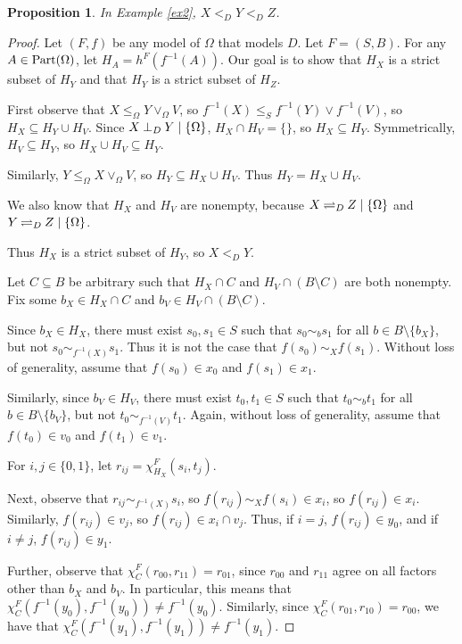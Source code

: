 \documentclass[authordate,onecolumn]{miri-tech-article}
\newtheorem{proposition}{Proposition}
\begin{document}
\begin{proposition}\label{exth2}
In Example \ref{ex2}, $X<_D Y<_D Z$.
\end{proposition}
\begin{proof}
Let $(F,f)$ be any model of $\Omega$ that models $D$. Let $F=(S,B)$. For any $A\in\parts[\Omega]$, let $H_A=h^F(f^{-1}(A))$. Our goal is to show that $H_X$ is a strict subset of $H_Y$ and that $H_Y$ is a strict subset of $H_Z$.

First observe that $X\leq_\Omega Y\vee_\Omega V$, so $f^{-1}(X)\leq_S f^{-1}(Y)\vee f^{-1}(V)$, so $H_X\subseteq H_Y\cup H_V$. Since $\cod{X}{Y}{\{\Omega\}}$, $H_X\cap H_V=\{\}$, so $H_X\subseteq H_Y$. Symmetrically, $H_V\subseteq H_Y$, so $H_X\cup H_V\subseteq H_Y$.

Similarly, $Y\leq_\Omega X\vee_\Omega V$, so $H_Y\subseteq H_X\cup H_V$. Thus $H_Y=H_X\cup H_V$.

We also know that $H_X$ and $H_V$ are nonempty, because $\ncod{X}{Z}{\{\Omega\}}$ and $\ncod{Y}{Z}{\{\Omega\}}$.

Thus $H_X$ is a strict subset of $H_Y$, so $X<_D Y$.

Let $C\subseteq B$ be arbitrary such that $H_X\cap C$ and $H_V\cap (B\setminus C)$ are both nonempty. Fix some $b_X\in H_X\cap C$ and $b_V\in H_V\cap (B\setminus C)$.

Since $b_X\in H_X$, there must exist $s_0,s_1\in S$ such that $s_0\sim_b s_1$ for all $b\in B\setminus\{b_X\}$, but not $s_0\sim_{f^{-1}(X)} s_1$. Thus it is not the case that $f(s_0)\sim_X f(s_1)$. Without loss of generality, assume that $f(s_0)\in x_0$ and $f(s_1)\in x_1$.

Similarly, since $b_V\in H_V$, there must exist $t_0,t_1\in S$ such that $t_0\sim_b t_1$ for all $b\in B\setminus\{b_V\}$, but not $t_0\sim_{f^{-1}(V)} t_1$. Again, without loss of generality, assume that $f(t_0)\in v_0$ and $f(t_1)\in v_1$. 

For $i,j\in \{0,1\}$, let $r_{ij}=\chi^F_{H_X}(s_i,t_j)$.

Next, observe that $r_{ij}\sim_{f^{-1}(X)} s_i$, so  $f(r_{ij})\sim_X f(s_i)\in x_i$, so $f(r_{ij})\in x_i$. Similarly, $f(r_{ij})\in v_j$, so $f(r_{ij})\in x_i\cap v_j$. Thus, if $i=j$, $f(r_{ij})\in y_0$, and if $i\neq j$, $f(r_{ij})\in y_1$.

Further, observe that $\chi^F_C(r_{00},r_{11})=r_{01}$,
since $r_{00}$ and $r_{11}$ agree on all factors other than $b_X$ and $b_V$. In particular, this means that $\chi^F_C(f^{-1}(y_0),f^{-1}(y_0))\neq f^{-1}(y_0)$. Similarly, since $\chi^F_C(r_{01},r_{10})=r_{00}$, we have that $\chi^F_C(f^{-1}(y_1),f^{-1}(y_1))\neq f^{-1}(y_1)$.


\end{proof}
\end{document}
